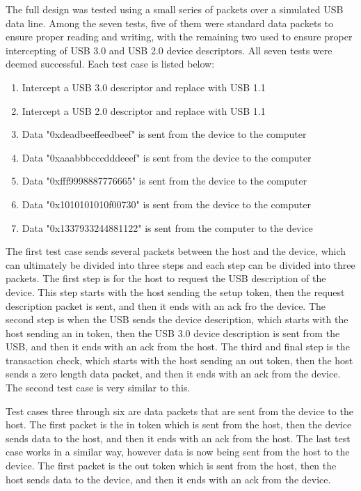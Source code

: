 \documentclass[12pt,letter,oneside]{report}
\begin{document}
The full design was tested using a small series of packets over a simulated USB data line. Among the seven tests, five of them were standard data packets to ensure proper reading and writing, with the remaining two used to ensure proper intercepting of USB 3.0 and USB 2.0 device descriptors. All seven tests were deemed successful. Each test case is listed below:

\begin{enumerate} \itemsep 1pt
	\item Intercept a USB 3.0 descriptor and replace with USB 1.1
	\item Intercept a USB 2.0 descriptor and replace with USB 1.1
	\item Data "0xdeadbeeffeedbeef" is sent from the device to the computer
	\item Data "0xaaabbbcccdddeeef" is sent from the device to the computer
	\item Data "0xfff9998887776665" is sent from the device to the computer
	\item Data "0x1010101010f00730" is sent from the device to the computer
	\item Data "0x1337933244881122" is sent from the computer to the device
\end{enumerate}

The first test case sends several packets between the host and the device, which can ultimately be divided into three steps and each step can be divided into three packets. The first step is for the host to request the USB description of the device. This step starts with the host sending the setup token, then the request description packet is sent, and then it ends with an ack fro the device. The second step is when the USB sends the device description, which starts with the host sending an in token, then the USB 3.0 device description is sent from the USB, and then it ends with an ack from the host. The third and final step is the transaction check, which starts with the host sending an out token, then the host sends a zero length data packet, and then it ends with an ack from the device. The second test case is very similar to this.

    Test cases three through six are data packets that are sent from the device to the host. The first packet is the in token which is sent from the host, then the device sends data to the host, and then it ends with an ack from the host. The last test case works in a similar way, however data is now being sent from the host to the device. The first packet is the out token which is sent from the host, then the host sends data to the device, and then it ends with an ack from the device. 
\end{document}
